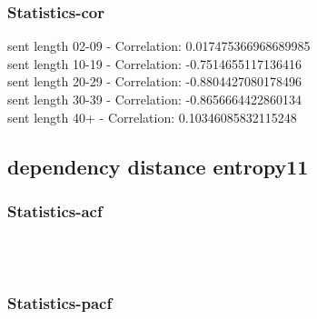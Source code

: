 \documentclass{article}%
\begin{document}
%
\newpage%
\subsubsection{Statistics{-}cor}%
\label{ssubsec:Statistics{-}cor}%
\noindent%
sent length 02-09 - Correlation: 0.017475366968689985\\%
sent length 10-19 - Correlation: -0.7514655117136416\\%
sent length 20-29 - Correlation: -0.8804427080178496\\%
sent length 30-39 - Correlation: -0.8656664422860134\\%
sent length 40+ - Correlation: 0.10346085832115248\\

%
\newpage

%
\subsection{dependency distance entropy11}%
\label{subsec:dependencydistanceentropy11}%
\subsubsection{Statistics{-}acf}%
\label{ssubsec:Statistics{-}acf}%


\begin{figure}[ht]%
\centering%
\setlength{\abovecaptionskip}{-35pt}%
%
%
\\%
%
%
\\%
%
\end{figure}

%
\newpage%
\subsubsection{Statistics{-}pacf}%
\label{ssubsec:Statistics{-}pacf}%
\end{document}
